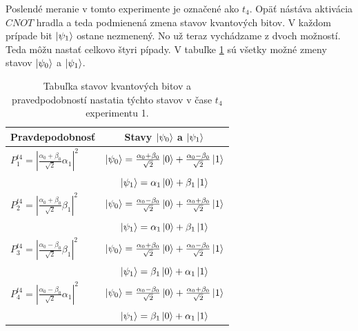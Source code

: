 Poslendé meranie v tomto experimente je označené ako \(t_4\). Opäť nástáva
aktivácia \(CNOT\) hradla a teda podmienená zmena stavov kvantových bitov.
V každom prípade bit \(\ket{\psi_1}\) ostane nezmenený. No už teraz vychádzame 
z dvoch možností. Teda môžu nastať celkovo štyri pípady. V tabuľke 
\ref{expr1_t4_states} sú všetky možné zmeny stavov \(\ket{\psi_0}\) a
\(\ket{\psi_1}\).

\begin{table}
\centering
\begin{tabular}{|l|c|}
\hline
\textbf{Pravdepodobnosť} & \textbf{Stavy \(\ket{\psi_0}\) a \(\ket{\psi_1}\)} \\
\hline
\(P^{t4}_1 = |\frac{\alpha_0 + \beta_0}{\sqrt{2}}\alpha_1|^2\) & 
\(\ket{\psi_0} = \frac{\alpha_0 + \beta_0}{\sqrt{2}}\ket{0} + \frac{\alpha_0 - \beta_0}{\sqrt{2}}\ket{1}\) \\
& \(\ket{\psi_1} = \alpha_1\ket{0} + \beta_1\ket{1}\) \\
\hline

\(P^{t4}_2 = |\frac{\alpha_0 + \beta_0}{\sqrt{2}}\beta_1|^2\) & 
\(\ket{\psi_0} = \frac{\alpha_0 - \beta_0}{\sqrt{2}}\ket{0} + \frac{\alpha_0 + \beta_0}{\sqrt{2}}\ket{1}\) \\
& \(\ket{\psi_1} = \alpha_1\ket{0} + \beta_1\ket{1}\) \\
\hline

\(P^{t4}_3 = |\frac{\alpha_0 - \beta_0}{\sqrt{2}}\beta_1|^2\) & 
\(\ket{\psi_0} = \frac{\alpha_0 + \beta_0}{\sqrt{2}}\ket{0} + \frac{\alpha_0 - \beta_0}{\sqrt{2}}\ket{1}\) \\
& \(\ket{\psi_1} = \beta_1\ket{0} + \alpha_1\ket{1}\) \\
\hline

\(P^{t4}_4 = |\frac{\alpha_0 - \beta_0}{\sqrt{2}}\alpha_1|^2\) & 
\(\ket{\psi_0} = \frac{\alpha_0 - \beta_0}{\sqrt{2}}\ket{0} + \frac{\alpha_0 + \beta_0}{\sqrt{2}}\ket{1}\) \\
& \(\ket{\psi_1} = \beta_1\ket{0} + \alpha_1\ket{1}\) \\
\hline

\end{tabular}

\caption{\label{expr1_t4_states} Tabuľka stavov kvantových bitov a pravedpodobností
nastatia týchto stavov v čase \(t_4\) experimentu 1.}
\end{table}

